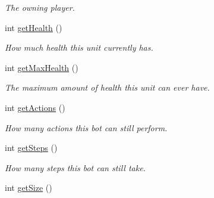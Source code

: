 \begin{DoxyCompactItemize}
\begin{DoxyCompactList}\small\item\em The owning player. \item\end{DoxyCompactList}\item 
\hypertarget{classBot_aac0c29873cecd6841910a49e1df18fd9}{
int \hyperlink{classBot_aac0c29873cecd6841910a49e1df18fd9}{getHealth} ()}
\label{classBot_aac0c29873cecd6841910a49e1df18fd9}

\begin{DoxyCompactList}\small\item\em How much health this unit currently has. \item\end{DoxyCompactList}\item 
\hypertarget{classBot_a3f4f393140205b8a1685ffbc686e10d8}{
int \hyperlink{classBot_a3f4f393140205b8a1685ffbc686e10d8}{getMaxHealth} ()}
\label{classBot_a3f4f393140205b8a1685ffbc686e10d8}

\begin{DoxyCompactList}\small\item\em The maximum amount of health this unit can ever have. \item\end{DoxyCompactList}\item 
\hypertarget{classBot_a6ee91c0312cd5350521245c77b6b05da}{
int \hyperlink{classBot_a6ee91c0312cd5350521245c77b6b05da}{getActions} ()}
\label{classBot_a6ee91c0312cd5350521245c77b6b05da}

\begin{DoxyCompactList}\small\item\em How many actions this bot can still perform. \item\end{DoxyCompactList}\item 
\hypertarget{classBot_aa589a8a7e52bbca650448c158096e8cc}{
int \hyperlink{classBot_aa589a8a7e52bbca650448c158096e8cc}{getSteps} ()}
\label{classBot_aa589a8a7e52bbca650448c158096e8cc}

\begin{DoxyCompactList}\small\item\em How many steps this bot can still take. \item\end{DoxyCompactList}\item 
\hypertarget{classBot_a8441680a647000cd5646fb4b8bb0f9eb}{
int \hyperlink{classBot_a8441680a647000cd5646fb4b8bb0f9eb}{getSize} ()}
\label{classBot_a8441680a647000cd5646fb4b8bb0f9eb}


\end{DoxyCompactItemize}

